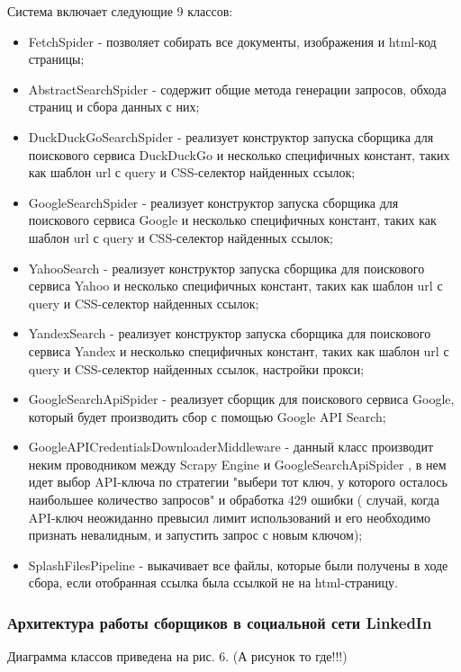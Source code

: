 Система включает следующие 9 классов:
\begin{itemize}
    \item FetchSpider - позволяет собирать все документы, изображения и html-код страницы;  
    \item AbstractSearchSpider - содержит общие метода генерации запросов, обхода страниц и сбора данных с них;
    \item DuckDuckGoSearchSpider - реализует конструктор запуска сборщика для поискового сервиса DuckDuckGo и несколько 
    специфичных констант, таких как шаблон url с query и CSS-селектор найденных ссылок;
    \item GoogleSearchSpider - реализует конструктор запуска сборщика для поискового сервиса Google и несколько 
    специфичных констант, таких как шаблон url с query и CSS-селектор найденных ссылок;
    \item YahooSearch - реализует конструктор запуска сборщика для поискового сервиса Yahoo и несколько 
    специфичных констант, таких как шаблон url с query и CSS-селектор найденных ссылок;
    \item YandexSearch - реализует конструктор запуска сборщика для поискового сервиса Yandex и несколько 
    специфичных констант, таких как шаблон url с query и CSS-селектор найденных ссылок, настройки прокси;
    \item GoogleSearchApiSpider - реализует сборщик для поискового сервиса Google, который будет
    производить сбор с помощью Google API Search;
    \item GoogleAPICredentialsDownloaderMiddleware - данный класс производит неким проводником между Scrapy Engine и GoogleSearchApiSpider
    , в нем идет выбор API-ключа по стратегии "выбери тот ключ, у которого осталось наибольшее количество запросов" и обработка 429 ошибки (
        случай, когда API-ключ неожиданно превысил лимит использований и его необходимо признать невалидным, и запустить запрос 
        с новым ключом);
    \item SplashFilesPipeline - выкачивает все файлы, которые были получены в ходе сбора, если отобранная ссылка была ссылкой 
    не на html-страницу.
\end{itemize}


\subsubsection{Архитектура работы сборщиков в социальной сети LinkedIn}
\par
Диаграмма классов приведена на рис. 6. (А рисунок то где!!!)

